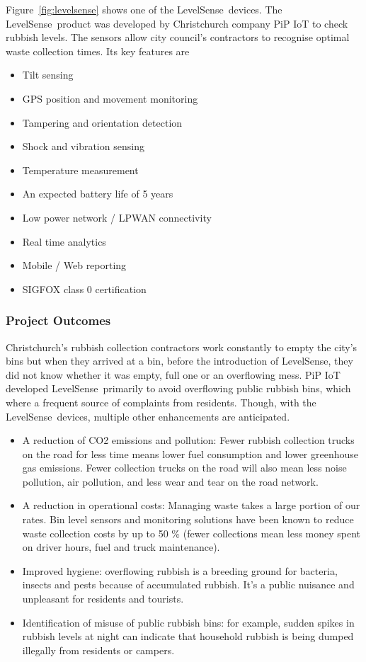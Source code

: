 \documentclass[10pt]{article}
\begin{document}
Figure~\ref{fig:levelsense} shows one of the LevelSense\texttrademark ~devices.
The LevelSense\texttrademark ~product was developed by Christchurch company PiP IoT to check rubbish levels. The sensors allow city council’s contractors to recognise optimal waste collection times. Its key features are
\begin{itemize}
\item Tilt sensing 
\item GPS position and movement monitoring
\item Tampering and orientation detection
\item Shock and vibration sensing
\item Temperature measurement
\item An expected battery life of 5 years
\item Low power network / LPWAN connectivity
\item Real time analytics
\item Mobile / Web reporting
\item SIGFOX class 0 certification
\end{itemize} 

\subsubsection{Project Outcomes}

Christchurch's rubbish collection contractors work constantly to empty the city's bins 
but when they arrived at a bin, before the introduction of LevelSense\texttrademark, they did not know whether it was empty, full one or an overflowing mess. 
PiP IoT developed LevelSense\texttrademark ~primarily to avoid overflowing public 
rubbish bins, which where a frequent source of complaints from residents.
Though, with the LevelSense\texttrademark ~devices, multiple other enhancements 
are anticipated.

\begin{itemize}
	\item
	A reduction of CO2 emissions and pollution: Fewer rubbish collection trucks on the road for less time means lower fuel consumption and lower greenhouse gas emissions. Fewer collection trucks on the road will also mean less noise pollution, air pollution, and less wear and tear on the road network.
	\item
	A reduction in operational costs: Managing waste takes a large portion of our rates. Bin level sensors and monitoring solutions have been known to reduce waste collection costs by up to 50 \% (fewer collections mean less money spent on driver hours, fuel and truck maintenance).
	\item
	Improved hygiene: overflowing rubbish is a breeding ground for bacteria, insects and pests because of accumulated rubbish. It’s a public nuisance and unpleasant for residents and tourists.
	\item
	Identification of misuse of public rubbish bins: for example, sudden spikes in rubbish levels at night can indicate that household rubbish is being dumped illegally from residents or campers. 
\end{itemize}
\end{document}
